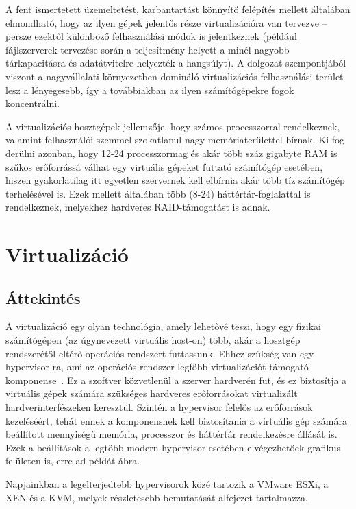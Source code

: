 A fent ismertetett üzemeltetést, karbantartást könnyítő felépítés mellett általában elmondható, hogy az ilyen gépek jelentős része virtualizációra van tervezve -- persze ezektől különböző felhasználási módok is jelentkeznek (például fájlszerverek tervezése során a teljesítmény helyett a minél nagyobb tárkapacitásra és adatátvitelre helyezték a hangsúlyt). A dolgozat szempontjából viszont a nagyvállalati környezetben domináló virtualizációs felhasználási terület lesz a lényegesebb, így a továbbiakban az ilyen számítógépekre fogok koncentrálni.

A virtualizációs hosztgépek jellemzője, hogy számos processzorral rendelkeznek, valamint felhasználói szemmel szokatlanul nagy memóriaterülettel bírnak. Ki fog derülni azonban, hogy 12-24 processzormag és akár több száz gigabyte RAM is szűkös erőforrássá válhat egy virtuális gépeket futtató számítógép esetében, hiszen gyakorlatilag itt egyetlen szervernek kell elbírnia akár több tíz számítógép terhelésével is. Ezek mellett általában több (8-24) háttértár-foglalattal is rendelkeznek, melyekhez hardveres RAID-támogatást is adnak.

\section{Virtualizáció}
\subsection{Áttekintés}
A virtualizáció egy olyan technológia, amely lehetővé teszi, hogy egy fizikai számítógépen (az úgynevezett virtuális host-on) több, akár a hosztgép rendszerétől eltérő operációs rendszert futtassunk. Ehhez szükség van egy \gls{hypervisor}-ra, ami az operációs rendszer legfőbb virtualizációt támogató komponense~\cite{Sles15virt}. Ez a szoftver közvetlenül a szerver hardverén fut, és ez biztosítja a virtuális gépek számára szükséges hardveres erőforrásokat virtualizált hardverinterfészeken keresztül. Szintén a \gls{hypervisor} felelős az erőforrások kezeléséért, tehát ennek a komponensnek kell biztosítania a virtuális gép számára beállított mennyiségű memória, processzor és háttértár rendelkezésre állását is. Ezek a beállítások a legtöbb modern \gls{hypervisor} esetében elvégezhetőek grafikus felületen is, erre ad példát  ábra.

Napjainkban a legelterjedtebb hypervisorok közé tartozik a VMware ESXi, a XEN és a KVM, melyek részletesebb bemutatását  alfejezet tartalmazza.

